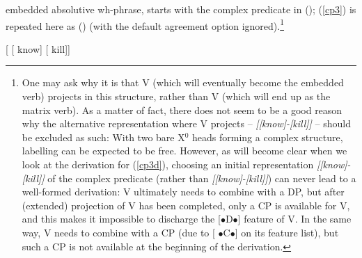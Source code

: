 \documentclass[output=paper
,modfonts
,nonflat]{langsci/langscibook}
\begin{document}
	embedded absolutive wh-phrase, starts with the complex predicate in
	(\Next); (\ref{cp3}) is repeated here as (\NNext) (with the default
	agreement option ignored).\footnote{\label{vari2}One may ask why it is
		that V (which will eventually become the embedded verb) projects
		in this structure, rather than V (which will end up as the matrix
		verb).  As a matter of fact, there does not seem to be a good reason
		why the alternative representation where V projects -- {\it
			[\sub{V\sub{1}}[know]-[kill]]} -- should be excluded as such:
		With two bare X$^0$ heads forming a complex structure, labelling can
		be expected to be free. However, as will become clear when we look
		at the derivation for (\ref{cp3d}), choosing an initial representation
		{\itshape [[know]-[kill]]} of the complex predicate
		(rather than {\itshape [[know]-[kill]]}) can never lead
		to a well-formed derivation: V ultimately needs to combine with a
		DP, but after (extended) projection of V has been completed, only
		a CP is available for V, and this makes it impossible to discharge
		the [{\small $\bullet$}D{\small $\bullet$}] feature of V. In the
		same way, V needs to combine with a CP (due to [{\small
			$\bullet$}C{\small $\bullet$}] on its feature list), but such a
		CP is not available at the beginning of the derivation.}
	
	\ea\relax\label{ex:mueller:30} {[} [ know] [ kill]]\z
	
\end{document}
